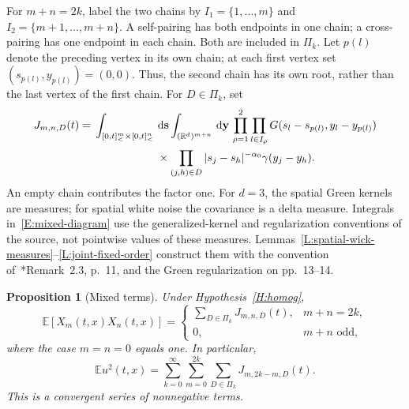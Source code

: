 \documentclass[12pt,oneside,openany]{book}
\makeatletter
\let\lean@pending\@empty
\newcommand{\LeanMarker}[1]{\gdef\lean@pending{#1}}
\numberwithin{equation}{section}
\newtheorem{proposition}[theorem]{Proposition}
\theoremstyle{nogostyle}
\theoremstyle{definition}
\newcommand{\R}{\mathbb{R}}
\newcommand{\E}{\mathbb{E}}
\newcommand{\ud}{\,\mathrm{d}}
\makeatother
\begin{document}
For $m+n = 2k$, label the two chains by $I_1 = \{1,\ldots,m\}$ and $I_2 =
\{m+1,\ldots,m+n\}$. A self-pairing has both endpoints in one chain; a
cross-pairing has one endpoint in each chain. Both are included in $\Pi_k$. Let
$p(l)$ denote the preceding vertex in its own chain; at each first vertex set
$(s_{p(l)},y_{p(l)}) = (0,0)$. Thus, the second chain has its own root, rather
than the last vertex of the first chain. For $D \in \Pi_k$, set
\begin{equation}\label{E:mixed-diagram}
  \begin{split}
    J_{m,n,D}(t)
    ={}&\int_{[0,t]^m_<\times[0,t]^n_<}\ud\mathbf{s}
    \int_{(\R^d)^{m+n}}\ud\mathbf{y}\,
    \prod_{\rho=1}^2\prod_{l\in I_\rho}
    G(s_l-s_{p(l)},y_l-y_{p(l)})\\
    &\hspace{20mm}\times
    \prod_{(j,h)\in D}|s_j-s_h|^{-\alpha_0}\gamma(y_j-y_h).
  \end{split}
\end{equation}
An empty chain contributes the factor one. For $d = 3$, the spatial Green
kernels are measures; for spatial white noise the covariance is a delta measure.
Integrals in~\eqref{E:mixed-diagram} use the generalized-kernel and
regularization conventions of the source, not pointwise values of these
measures. Lemmas~\ref{L:spatial-wick-measures}--\ref{L:joint-fixed-order}
construct them with the convention
of~\cite{chen:author2026:time-dependency}*{Remark~2.3, p.~11, and the Green
regularization on pp.~13--14}.
\LeanMarker{P:mixed}%
\begin{proposition}[Mixed terms]\label{P:mixed}
  Under Hypothesis~\ref{H:homog},
  \begin{equation}\label{E:mixed-moment}
    \E[X_m(t,x)X_n(t,x)]
    =\begin{cases}
      \displaystyle\sum_{D\in\Pi_k}J_{m,n,D}(t),&m+n=2k,\\
      0,&m+n\text{ odd},
    \end{cases}
  \end{equation}
  where the case $m = n = 0$ equals one. In particular,
  \begin{equation}\label{E:full-second}
    \E u^2(t,x)=\sum_{k=0}^\infty\sum_{m=0}^{2k}
    \sum_{D\in\Pi_k}J_{m,2k-m,D}(t).
  \end{equation}
  This is a convergent series of nonnegative terms.
\end{proposition}
\end{document}
